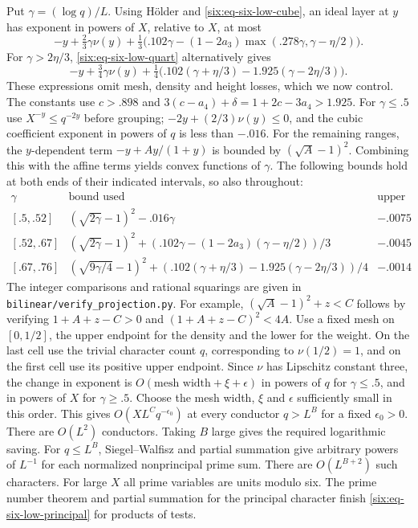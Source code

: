 \documentclass[11pt,a4paper]{article}
\theoremstyle{paperplain}
\numberwithin{equation}{section}
\begin{document}
Put \(\gamma=(\log q)/L\). Using H\"older and
\eqref{six:eq-six-low-cube}, an ideal layer at \(y\) has exponent in
powers of \(X\), relative to \(X\), at most
\begin{equation}\label{six:eq-six-low-expcube}
 -y+\tfrac23\gamma\nu(y)+
 \tfrac13\bigl(.102\gamma-(1-2a_3)
       \max(.278\gamma,\gamma-\eta/2)\bigr).
\end{equation}
For \(\gamma>2\eta/3\), \eqref{six:eq-six-low-quart} alternatively gives
\begin{equation}\label{six:eq-six-low-expquart}
 -y+\tfrac34\gamma\nu(y)+
 \tfrac14\bigl(.102(\gamma+\eta/3)-1.925(\gamma-2\eta/3)\bigr).
\end{equation}
These expressions omit mesh, density and height losses, which we
now control. The constants use \(c>.898\) and
\(3(c-a_4)+\delta=1+2c-3a_4>1.925\).
For \(\gamma\le.5\) use \(X^{-y}\le q^{-2y}\) before grouping;
\(-2y+(2/3)\nu(y)\le0\), and the cubic coefficient exponent in
powers of \(q\) is less than \(-.016\). For the remaining ranges,
the \(y\)-dependent term \(-y+Ay/(1+y)\) is bounded by
\((\sqrt A-1)^2\). Combining this with the affine terms yields
convex functions of \(\gamma\). The following bounds hold at both
ends of their indicated intervals, so also throughout:
\[
\begin{array}{c|c|c}
 \gamma &\text{bound used}&\text{upper bound}\\ \hline
 {}[.5,.52]&(\sqrt{2\gamma}-1)^2-.016\gamma&-.0075\\
 {}[.52,.67]&(\sqrt{2\gamma}-1)^2+
   (.102\gamma-(1-2a_3)(\gamma-\eta/2))/3&-.0045\\
 {}[.67,.76]&(\sqrt{9\gamma/4}-1)^2+
   (.102(\gamma+\eta/3)-1.925(\gamma-2\eta/3))/4&-.0014
\end{array}
\]
The integer comparisons and rational squarings are given in
\texttt{bilinear/verify\_projection.py}. For example,
\((\sqrt A-1)^2+z<C\) follows by verifying \(1+A+z-C>0\)
and \((1+A+z-C)^2<4A\).
Use a fixed mesh on \([0,1/2]\), the upper endpoint for the density
and the lower for the weight. On the last cell use the trivial
character count \(q\), corresponding to \(\nu(1/2)=1\), and on
the first cell use its positive upper endpoint. Since \(\nu\) has
Lipschitz constant three, the change in exponent is
\(O(\text{mesh width}+\xi+\epsilon)\) in powers of \(q\) for
\(\gamma\le.5\), and in powers of \(X\) for \(\gamma\ge.5\).
Choose the mesh width, \(\xi\) and \(\epsilon\) sufficiently small
in this order. This gives \(O(XL^Cq^{-\epsilon_0})\) at every
conductor \(q>L^B\) for a fixed \(\epsilon_0>0\).
There are \(O(L^2)\) conductors. Taking \(B\) large gives the
required logarithmic saving. For \(q\le L^B\), Siegel--Walfisz and
partial summation give arbitrary powers of \(L^{-1}\) for each
normalized nonprincipal prime sum. There are \(O(L^{B+2})\) such
characters. For large \(X\) all prime variables are units modulo
six. The prime number theorem and partial summation for the principal
character finish \eqref{six:eq-six-low-principal} for products of tests.
\end{document}
